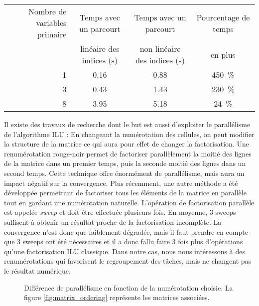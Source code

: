 \begin{center}
  \begin{tabular}{|r|c|c|c|}
    \hline
    Nombre de variables primaire & Temps avec un parcourt & Temps avec un parcourt & Pourcentage de temps\\
    & linéaire des indices (s) & non linéaire des indices (s) & en plus \\
    \hline
    1 & 0.16 & 0.88 & 450~\% \\
    \hline
    3 & 0.43 & 1.43 & 230~\% \\
    \hline
    8 & 3.95 & 5.18 & 24~\% \\
    \hline
  \end{tabular}
  \label{tab:facto_order}
\end{center}


Il existe des travaux de recherche dont le but est aussi d'exploiter le parallélisme de l'algorithme ILU :
%
En changeant la numérotation des cellules, on peut modifier la structure de la matrice ce qui aura pour effet de changer la factorisation.
%
Une renumérotation rouge-noir permet de factoriser parallèlement la moitié des lignes de la matrice dans un premier temps, puis la seconde moitié des lignes dans un second temps.
%
Cette technique offre énormément de parallélisme, mais aura un impact négatif sur la convergence\cite{red_black_ilu}.
%
Plus récemment, une autre méthode a été développée permettant de factoriser tous les éléments de la matrice en parallèle tout en gardant une numérotation naturelle.
%
L'opération de factorisation parallèle est appelée {\em sweep} et doit être effectuée plusieurs fois\cite{chow2014fine}.
%
En moyenne, 3 sweeps suffisent à obtenir un résultat proche de la factorisation incomplète.
%
La convergence n'est donc que faiblement dégradée, mais il faut prendre en compte que 3 sweeps ont été nécessaires et il a donc fallu faire 3 fois plus d'opérations qu'une factorisation ILU classique.
%
Dans notre cas, nous nous intéressons à des renumérotations qui favorisent le regroupement des tâches, mais ne changent pas le résultat numérique.

\begin{figure}[!h]
     \begin{center}
    \end{center}
    \caption{Différence de parallélisme en fonction de la numérotation choisie. La figure \ref{fig:matrix_ordering} représente les matrices associées.}
    \label{fig:DAG_ordering}
\end{figure}
